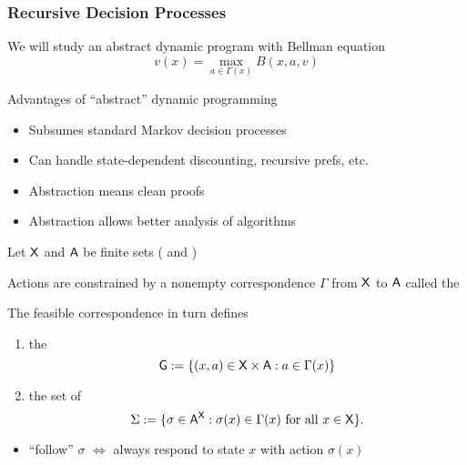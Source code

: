 \begin{frame}
    \frametitle{Recursive Decision Processes}

    We will study an abstract dynamic program with Bellman equation
    \begin{equation*}
        v(x) = \max_{a \in \Gamma(x)} B(x, a, v)
    \end{equation*}

        \vspace{0.5em}
        \vspace{0.5em}
    Advantages of ``abstract'' dynamic programming

    \begin{itemize}
        \item Subsumes standard Markov decision processes
        \vspace{0.5em}
        \item Can handle state-dependent discounting, recursive prefs, etc.
        \vspace{0.5em}
        \item Abstraction means clean proofs
        \vspace{0.5em}
        \item Abstraction allows better analysis of algorithms
    \end{itemize}

\end{frame}


\begin{frame}
    
    Let $\mathsf X$ and $\mathsf A$ be finite sets ( and )

        \vspace{0.5em}
    Actions are constrained by 
        a nonempty correspondence $\Gamma$ from $\mathsf X$ to $\mathsf A$ called
            the 


    The feasible correspondence in turn defines
    \begin{enumerate}
        \item the 
            \begin{equation*}
                \mathsf G := \{ (x, a) \in \mathsf X \times \mathsf A : a \in \Gamma(x) \}
            \end{equation*}
        \item the set of  
            \begin{equation*}
                \Sigma := 
                    \{ \sigma \in \mathsf A^\mathsf X : \sigma(x) \in \Gamma(x) \text{ for all } x \in \mathsf X \}.
            \end{equation*}
    \end{enumerate}

    \begin{itemize}
        \item ``follow'' $\sigma$ $\iff$ always respond to state $x$ with action
            $\sigma(x)$
    \end{itemize}

\end{frame}

